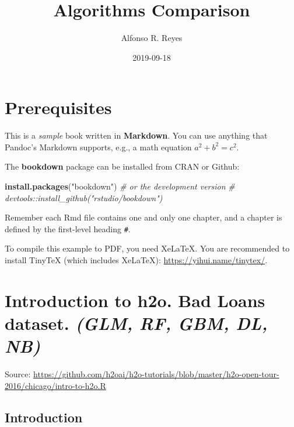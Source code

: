 \documentclass[]{book}
\title{Algorithms Comparison}
\author{Alfonso R. Reyes}
\date{2019-09-18}
\newenvironment{Shaded}{\begin{snugshade}}{\end{snugshade}}
\newcommand{\CommentTok}[1]{\textcolor[rgb]{0.56,0.35,0.01}{\textit{#1}}}
\newcommand{\KeywordTok}[1]{\textcolor[rgb]{0.13,0.29,0.53}{\textbf{#1}}}
\newcommand{\NormalTok}[1]{#1}
\newcommand{\StringTok}[1]{\textcolor[rgb]{0.31,0.60,0.02}{#1}}
\begin{document}
\maketitle

{
\setcounter{tocdepth}{1}
\tableofcontents
}
\hypertarget{prerequisites}{%
\chapter*{Prerequisites}\label{prerequisites}}

This is a \emph{sample} book written in \textbf{Markdown}. You can use anything that Pandoc's Markdown supports, e.g., a math equation \(a^2 + b^2 = c^2\).

The \textbf{bookdown} package can be installed from CRAN or Github:

\begin{Shaded}
\begin{Highlighting}[]
\KeywordTok{install.packages}\NormalTok{(}\StringTok{"bookdown"}\NormalTok{)}
\CommentTok{# or the development version}
\CommentTok{# devtools::install_github("rstudio/bookdown")}
\end{Highlighting}
\end{Shaded}

Remember each Rmd file contains one and only one chapter, and a chapter is defined by the first-level heading \texttt{\#}.

To compile this example to PDF, you need XeLaTeX. You are recommended to install TinyTeX (which includes XeLaTeX): \url{https://yihui.name/tinytex/}.

\hypertarget{introduction-to-h2o.-bad-loans-dataset.-glm-rf-gbm-dl-nb}{%
\chapter{\texorpdfstring{Introduction to h2o. Bad Loans dataset. \emph{(GLM, RF, GBM, DL, NB)}}{Introduction to h2o. Bad Loans dataset. (GLM, RF, GBM, DL, NB)}}\label{introduction-to-h2o.-bad-loans-dataset.-glm-rf-gbm-dl-nb}}

Source: \url{https://github.com/h2oai/h2o-tutorials/blob/master/h2o-open-tour-2016/chicago/intro-to-h2o.R}

\hypertarget{introduction}{%
\section{Introduction}\label{introduction}}
\end{document}
